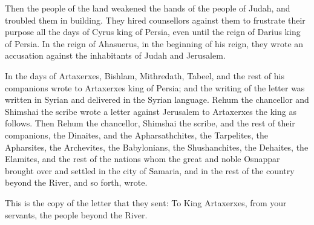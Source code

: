  Then the people of the land weakened the hands of the
people of Judah, and troubled them in building.  They
hired counsellors against them to frustrate their purpose all the days
of Cyrus king of Persia, even until the reign of Darius king of Persia.
 In the reign of Ahasuerus, in the beginning of his reign,
they wrote an accusation against the inhabitants of Judah and Jerusalem.

 In the days of Artaxerxes, Bishlam, Mithredath, Tabeel,
and the rest of his companions wrote to Artaxerxes king of Persia; and
the writing of the letter was written in Syrian and delivered in the
Syrian language.  Rehum the chancellor and Shimshai the
scribe wrote a letter against Jerusalem to Artaxerxes the king as
follows.  Then Rehum the chancellor, Shimshai the scribe,
and the rest of their companions, the Dinaites, and the Apharsathchites,
the Tarpelites, the Apharsites, the Archevites, the Babylonians, the
Shushanchites, the Dehaites, the Elamites,  and the rest
of the nations whom the great and noble Osnappar brought over and
settled in the city of Samaria, and in the rest of the country beyond
the River, and so forth, wrote.

 This is the copy of the letter that they sent: To King
Artaxerxes, from your servants, the people beyond the River.

